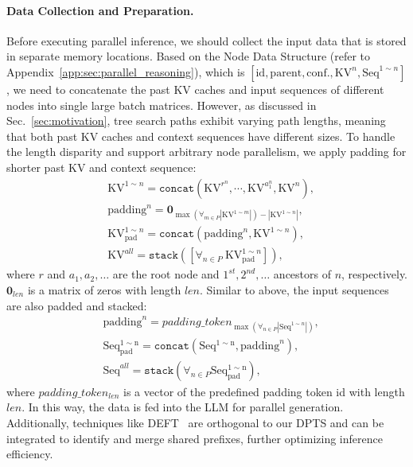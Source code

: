 \paragraph{Data Collection and Preparation.} 
Before executing parallel inference, we should collect the input data that is stored in separate memory locations. Based on the Node Data Structure (refer to Appendix~\ref{app:sec:parallel_reasoning}), which is $[\mathrm{id}, \mathrm {parent}, \mathrm {conf.}, \mathrm {KV}^n, \mathrm {Seq}^{1 \sim n}]$, we need to concatenate the past KV caches and input sequences of different nodes into single large batch matrices. However, as discussed in Sec.~\ref{sec:motivation}, tree search paths exhibit varying path lengths, meaning that both past KV caches and context sequences have different sizes. 
To handle the length disparity and support arbitrary node parallelism, we apply padding for shorter past KV and context sequence: 
\begin{equation}
\label{eq:kv}
\begin{split}
    & \mathrm{KV}^{1\sim n} = \mathtt{concat}\left(\mathrm{KV}^{r^n}, \cdots, \mathrm{KV}^{a^n_1}, \mathrm{KV}^n\right), \\
    & \mathrm{padding}^n = \mathbf{0}_{\max\left(\forall_{m\in P}|\mathrm{KV}^{1\sim m}| \right) - |\mathrm{KV}^{1\sim n}|},  \\
    & \mathrm{KV}^{1\sim n}_{\mathrm{pad}} =  \mathtt{concat} \left(\mathrm{padding}^{n}, \mathrm{KV}^{1\sim n} \right), \\
    & \mathrm{KV}^{all} =  \mathtt{stack}\left ( [\forall_{n\in P}\ \mathrm{KV}^{1\sim n}_{\mathrm{pad}}]\right), 
\end{split}
\end{equation}
where $r$ and  $a_1, a_2, \dots$ are the root node and $1^{st}, 2^{nd}, \dots$ ancestors of $n$, respectively. $\mathbf{0}_{len}$ is a matrix of zeros with length $len$. Similar to above, the input sequences are also padded and stacked: 
\begin{equation}
\label{eq:seq}
\begin{split}
& \mathrm{padding}^n = padding\_token_{\max(\forall_{n\in P} |\mathrm{Seq}^{1\sim n}|)},  \\
& \mathrm{Seq^{1\sim n}_{pad}} =  \mathtt{concat} \left(  \mathrm{Seq^{1\sim n}}, \mathrm{padding}^n\right), \\ 
& \mathrm{Seq}^{all}=\mathtt{stack}\left( \forall_{n\in P}\mathrm{Seq^{1\sim n}_{pad}} \right), 
\end{split}
\end{equation}
where $padding\_token_{len}$ is a vector of the predefined padding token id with length $len$. 
In this way, the data is fed into the LLM for parallel generation. Additionally, techniques like DEFT~\cite{yao2024deft} are orthogonal to our DPTS and can be integrated to identify and merge shared prefixes, further optimizing inference efficiency.

